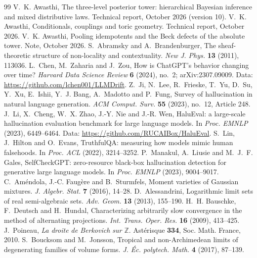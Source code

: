 \documentclass[11pt]{article}
\theoremstyle{definition}
\begin{document}
\begin{thebibliography}{99}\small
{} V.~K. Awasthi, The three-level posterior tower: hierarchical Bayesian inference and mixed distributive laws. Technical
report, October 2026 (version 10).
 V.~K. Awasthi, Conditionals, couplings and toric geometry. Technical report, October 2026.
 V.~K. Awasthi, Pooling idempotents and the Beck defects of the absolute tower. Note, October 2026.
 S.~Abramsky and A.~Brandenburger, The sheaf-theoretic structure of non-locality and contextuality.
\emph{New J. Phys.} \textbf{13} (2011), 113036.
 L.~Chen, M.~Zaharia and J.~Zou, How is ChatGPT's behavior changing over time? \emph{Harvard Data Science
Review} \textbf{6} (2024), no.~2; arXiv:2307.09009. Data: \url{https://github.com/lchen001/LLMDrift}.
 Z.~Ji, N.~Lee, R.~Frieske, T.~Yu, D.~Su, Y.~Xu, E.~Ishii, Y.~J. Bang, A.~Madotto and P.~Fung, Survey of hallucination in
natural language generation. \emph{ACM Comput. Surv.} \textbf{55} (2023), no.~12, Article 248.
 J.~Li, X.~Cheng, W.~X. Zhao, J.-Y. Nie and J.-R. Wen, HaluEval: a large-scale hallucination evaluation benchmark
for large language models. In \emph{Proc. EMNLP} (2023), 6449--6464. Data: \url{https://github.com/RUCAIBox/HaluEval}.
 S.~Lin, J.~Hilton and O.~Evans, TruthfulQA: measuring how models mimic human falsehoods. In \emph{Proc. ACL}
(2022), 3214--3252.
 P.~Manakul, A.~Liusie and M.~J.~F. Gales, SelfCheckGPT: zero-resource black-box hallucination detection for
generative large language models. In \emph{Proc. EMNLP} (2023), 9004--9017.
 C.~Am\'endola, J.-C. Faug\`ere and B.~Sturmfels, Moment varieties of Gaussian mixtures. \emph{J. Algebr. Stat.}
\textbf{7} (2016), 14--28.
 D.~Alessandrini, Logarithmic limit sets of real semi-algebraic sets. \emph{Adv. Geom.} \textbf{13} (2013),
155--190.
 H.~H. Bauschke, F.~Deutsch and H.~Hundal, Characterizing arbitrarily slow convergence in the method
of alternating projections. \emph{Int. Trans. Oper. Res.} \textbf{16} (2009), 413--425.
 J.~Poineau, \emph{La droite de Berkovich sur $\mathbb{Z}$}. Ast\'erisque \textbf{334}, Soc. Math. France, 2010.
 S.~Boucksom and M.~Jonsson, Tropical and non-Archimedean limits of degenerating families of volume forms.
  \emph{J. \'Ec. polytech. Math.} \textbf{4} (2017), 87--139.

\end{thebibliography}
\end{document}
